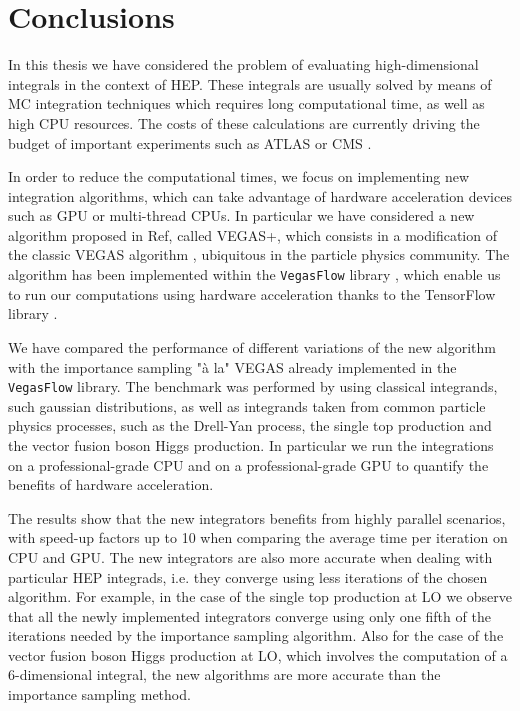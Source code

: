 \documentclass[../main/main.tex]{subfiles}
\begin{document}
\chapter{Conclusions}

In this thesis we have considered the problem of evaluating high-dimensional integrals in the context of HEP.
These integrals are usually solved by means of MC integration techniques which requires long computational time, as well as high CPU resources.
The costs of these calculations are currently driving the budget of important experiments such as ATLAS or CMS \cite{Buckley:2019wov}.

In order to reduce the computational times, we focus on implementing new integration algorithms, which can take advantage of hardware acceleration devices such as GPU or multi-thread CPUs.
In particular we have considered a new algorithm proposed in Ref\cite{Lepage:2020tgj}, called VEGAS+,  which consists in a modification of the classic VEGAS algorithm \cite{Lepage:1977sw}, ubiquitous in the particle physics community.
The algorithm has been implemented within the \texttt{VegasFlow} library \cite{Carrazza:2020rdn}, which enable us to run our computations using hardware acceleration thanks to the TensorFlow library
\cite{tensorflow2015-whitepaper}. 

We have compared the performance of different variations of the new algorithm with the importance sampling "à la" VEGAS already implemented in the \texttt{VegasFlow} library. The benchmark was performed by using classical integrands, such gaussian distributions, as well as integrands taken from common particle physics processes, such as the Drell-Yan process, the single top production and the vector fusion boson Higgs production. In particular we run the integrations on a professional-grade CPU and on a professional-grade GPU to quantify the benefits of hardware acceleration.

The results show that the new integrators benefits from highly parallel scenarios, with speed-up factors up to 10 when comparing the average time per iteration on CPU and GPU. The new integrators are also more accurate when dealing with particular HEP integrads, i.e. they converge using less iterations of the chosen algorithm. For example, 
in the case of the single top production at LO we observe that all the newly implemented integrators converge using only one fifth of the iterations needed by the importance sampling algorithm. Also for the case of the vector fusion boson Higgs production at LO, which involves the computation of a 6-dimensional integral, the new algorithms are more accurate than the importance sampling method.
\end{document}
